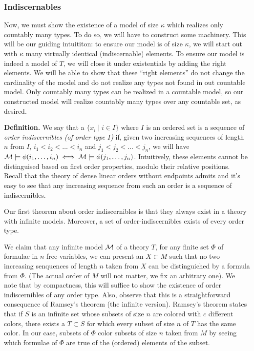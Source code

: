 \subsubsection{Indiscernables}
Now, we must show the existence of a model of size \(\kappa\) which realizes only countably many types. To do so, we will have to construct some machinery.
This will be our guiding intuititon: to ensure our model is of size \(\kappa\), we will start out with \(\kappa\) many virtually identical (indiscernable) elements. 
To ensure our model is indeed a model of \(T\), we will close it under existentials by adding the right elements. 
We will be able to show that these ``right elements'' do not change the cardinality of the model and do not realize any types not found in out countable model.
Only countably many types can be realized in a countable model, so our constructed model will realize countably many types over any countable set, as desired. 

\textbf{Definition.} We say that a \(\{x_i \mid i \in I\}\) where \(I\) is an ordered set is a sequence of \textit{order indiscernibles (of order type \(I\))} if, given two increasing sequences of length \(n\) from \(I\), 
\(i_1 < i_2 < \ldots < i_n\) and \(j_1 < j_2 < \ldots < j_n\), we will have \(\mathcal{M} \models \phi(i_1, \ldots, i_n) \iff \mathcal{M} \models \phi(j_1, \ldots, j_n)\). 
Intuitively, these elements cannot be distinguised based on first order properties, modulo their relative positions.  
Recall that the theory of dense linear orders without endpoints admits \qe and it's easy to see that any increasing sequence from such an order is a sequence of indiscernibles. 


Our first theorem about order indiscernibles is that they always exist in a theory with infinite models.
Moreover, a set of order-indiscernibles exists of every order type.

We claim that any infinite model \(\mathcal{M}\) of a theory \(T\), for any finite set \(\Phi\) of formulae in \(n\) free-variables, we can present an \(X \subset M\) such that no two increasing senquences of length \(n\) taken from \(X\) can be distinguiched by a formula from \(\Phi\). 
(The actual order of \(M\) will not matter, we fix an arbitrary one).
We note that by compactness, this will suffice to show the existence of order indiscernibles of any order type. 
Also, observe that this is a straightforward consequence of Ramsey's theorem (the infinite version).
Ramsey's theorem states that if \(S\) is an infinite set whose subsets of size \(n\) are colored with \(c\) different colors, there exists a \(T \subset S\) for which every subset of size \(n\) of \(T\) has the same color. 
In our case, subsets of \(\Phi\) color subsets of size \(n\) taken from \(M\) by seeing which formulae of \(\Phi\) are true of the (ordered) elements of the subset.

